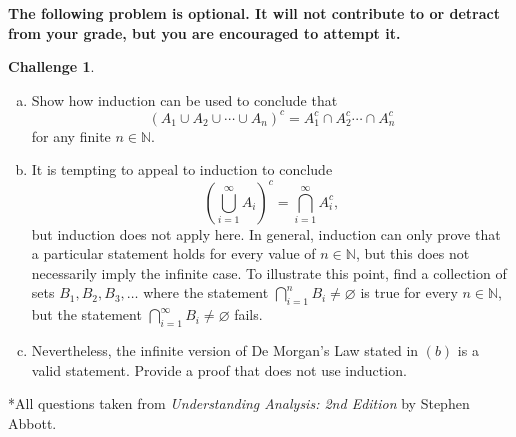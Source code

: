 \documentclass{amsart}
\newcommand{\+}[1]{\ensuremath{\mathbf{#1}}}
\renewcommand{\emptyset}{\varnothing}
\theoremstyle{definition}
\newtheorem{chal}{Challenge}
\begin{document}
\vspace{5mm}

{\bf The following problem is optional.  It
will not contribute to or detract from your grade, but you are encouraged
to attempt it.}

\vspace{5mm}

\begin{chal}
\begin{enumerate}[(a)]
 \item Show how induction can be used to conclude that
 \[
 (A_1 \cup A_2 \cup \cdots \cup A_n)^c = A^c_1 \cap A^c_2 \cdots \cap A^c_n
 \]
 for any finite $n \in \mathbb{N}$.
 \item It is tempting to appeal to induction to conclude
 \[
\left(\bigcup^{\infty}_{i=1} A_i\right)^c = \bigcap^{\infty}_{i=1} A^c_i, 
 \]
 but induction does not apply here.  In general,
 induction can only prove that a particular statement
 holds for every value of $n \in \mathbb{N}$,
 but this does not necessarily imply the infinite case.
 To illustrate this point,
 find a collection of sets $B_1, B_2, B_3, \ldots$
 where the statement $\bigcap^n_{i=1} B_i \neq \emptyset$ is true for
 every $n \in \mathbb{N}$, but the statement $\bigcap^{\infty}_{i=1} B_i \neq \emptyset$
 fails.
 \item Nevertheless, the infinite version of De Morgan's Law
 stated in $(b)$ is a valid statement.  Provide a proof that
 does not use induction.
\end{enumerate}
\end{chal}



\vspace{5mm}

*All questions taken from \emph{Understanding Analysis: 2nd Edition} by Stephen Abbott.
\end{document}
